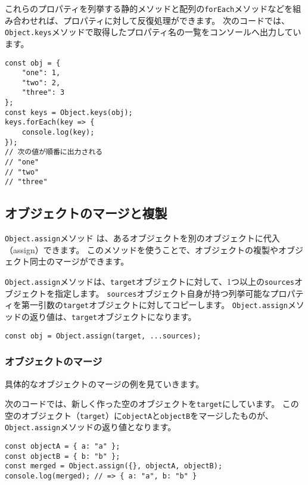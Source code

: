 これらのプロパティを列挙する静的メソッドと配列の\texttt{forEach}メソッドなどを組み合わせれば、プロパティに対して反復処理ができます。
次のコードでは、\texttt{Object.keys}メソッドで取得したプロパティ名の一覧をコンソールへ出力しています。

\enlargethispage{\baselineskip}\begin{lstlisting}
const obj = {
    "one": 1,
    "two": 2,
    "three": 3
};
const keys = Object.keys(obj);
keys.forEach(key => {
    console.log(key);
});
// 次の値が順番に出力される
// "one"
// "two"
// "three"
\end{lstlisting}

\hypertarget{copy-and-merge}{%
\subsection{オブジェクトのマージと複製}\label{copy-and-merge}}

\texttt{Object.assign}メソッド\,\protect{}\,は、あるオブジェクトを別のオブジェクトに代入（assign）できます。
このメソッドを使うことで、オブジェクトの複製やオブジェクト同士のマージができます。

\texttt{Object.assign}メソッドは、\texttt{target}オブジェクトに対して、1つ以上の\texttt{sources}オブジェクトを指定します。
\texttt{sources}オブジェクト自身が持つ列挙可能なプロパティを第一引数の\texttt{target}オブジェクトに対してコピーします。
\texttt{Object.assign}メソッドの返り値は、\texttt{target}オブジェクトになります。

\begin{lstlisting}
const obj = Object.assign(target, ...sources);
\end{lstlisting}

\hypertarget{merge}{%
\subsubsection{オブジェクトのマージ}\label{merge}}

具体的なオブジェクトのマージの例を見ていきます。

次のコードでは、新しく作った空のオブジェクトを\texttt{target}にしています。
この空のオブジェクト（\texttt{target}）に\texttt{objectA}と\texttt{objectB}をマージしたものが、\texttt{Object.assign}メソッドの返り値となります。

\begin{lstlisting}
const objectA = { a: "a" };
const objectB = { b: "b" };
const merged = Object.assign({}, objectA, objectB);
console.log(merged); // => { a: "a", b: "b" }
\end{lstlisting}


